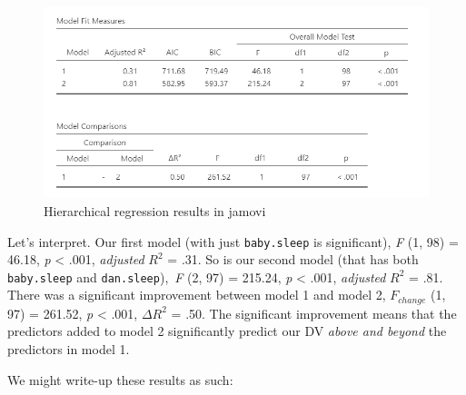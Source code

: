 \documentclass[
]{book}
\begin{document}
\begin{figure}

{\centering \includegraphics[width=1\linewidth]{images/13-regression/hierarchical-results} 

}

\caption{Hierarchical regression results in jamovi}\label{fig:unnamed-chunk-13}
\end{figure}

Let's interpret. Our first model (with just \texttt{baby.sleep} is significant), \emph{F} (1, 98) = 46.18, \emph{p} \textless{} .001, \emph{adjusted} \(R^2\) = .31. So is our second model (that has both \texttt{baby.sleep} and \texttt{dan.sleep}),~\emph{F} (2, 97) = 215.24, \emph{p} \textless{} .001, \emph{adjusted} \(R^2\) = .81. There was a significant improvement between model 1 and model 2, \(F_{change}\) (1, 97) = 261.52, \emph{p} \textless{} .001, \(\Delta R^2\) = .50. The significant improvement means that the predictors added to model 2 significantly predict our DV \emph{above and beyond} the predictors in model 1.

We might write-up these results as such:
\end{document}
